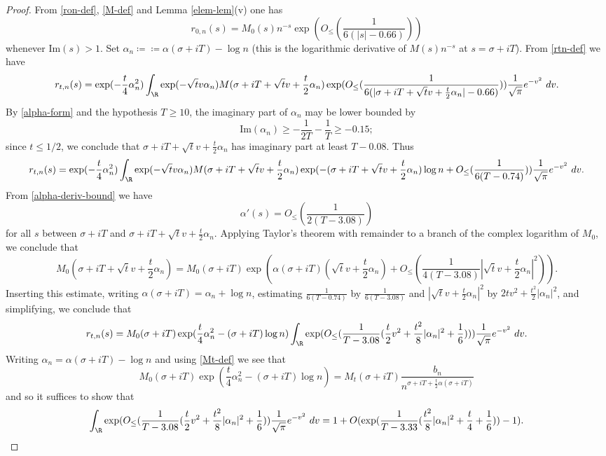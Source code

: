 \begin{proof}  From \eqref{ron-def}, \eqref{M-def} and Lemma \ref{elem-lem}(v) one has
$$ 
r_{0,n}(s) = M_0(s) n^{-s} \exp( O_{\leq}( \frac{1}{6(|s|-0.66)} ) )
$$
whenever $\mathrm{Im}(s) > 1$.  Set $\alpha_n \coloneqq \coloneqq \alpha(\sigma+iT) - \log n$ (this is the logarithmic derivative of $M(s) n^{-s}$ at $s=\sigma+iT$).  From \eqref{rtn-def} we have
$$
 r_{t,n}(s) = \exp( - \frac{t}{4} \alpha_n^2) \int_\R \exp( - \sqrt{t} v \alpha_n) M( \sigma + iT + \sqrt{t} v + \frac{t}{2} \alpha_n) 
\exp( O_{\leq}( \frac{1}{6(|\sigma+iT+\sqrt{t} v + \frac{t}{2} \alpha_n|-0.66)} ) )
\frac{1}{\sqrt{\pi}} e^{-v^2}\ dv.
$$
By \eqref{alpha-form} and the hypothesis $T \geq 10$, the imaginary part of $\alpha_n$ may be lower bounded by
$$ \mathrm{Im}(\alpha_n) \geq -\frac{1}{2T} - \frac{1}{T} \geq -0.15;$$
since $t \leq 1/2$, we conclude that $\sigma+iT+\sqrt{t} v + \frac{t}{2} \alpha_n$ has imaginary part at least $T - 0.08$.  Thus
$$
 r_{t,n}(s) = \exp( - \frac{t}{4} \alpha_n^2) \int_\R \exp( - \sqrt{t} v \alpha_n) M( \sigma + iT + \sqrt{t} v + \frac{t}{2} \alpha_n) \exp( -(\sigma+iT+\sqrt{t} v + \frac{t}{2} \alpha_n ) \log n + O_{\leq}( \frac{1}{6(T - 0.74)} ) )
\frac{1}{\sqrt{\pi}} e^{-v^2}\ dv.
$$
From \eqref{alpha-deriv-bound} we have
$$ \alpha'(s) = O_{\leq}( \frac{1}{2(T-3.08)} )$$
for all $s$ between $\sigma+iT$ and $\sigma + iT + \sqrt{t} v + \frac{t}{2} \alpha_n$.  Applying Taylor's theorem with remainder to a branch of the complex logarithm of $M_0$, we conclude that
$$ M_0( \sigma + iT + \sqrt{t} v + \frac{t}{2} \alpha_n) = M_0(\sigma+iT) \exp( \alpha(\sigma+iT) (\sqrt{t} v + \frac{t}{2} \alpha_n) + O_{\leq}( \frac{1}{4(T-3.08)} |\sqrt{t} v + \frac{t}{2} \alpha_n|^2 )).$$
Inserting this estimate, writing $\alpha(\sigma+iT) = \alpha_n + \log n$, estimating $\frac{1}{6(T-0.74)}$ by $\frac{1}{6(T-3.08)}$ and $|\sqrt{t} v + \frac{t}{2} \alpha_n|^2$ by $2tv^2 + \frac{t^2}{2} |\alpha_n|^2$, and simplifying, we conclude that
$$
 r_{t,n}(s) = M_0(\sigma+iT) \exp( \frac{t}{4} \alpha_n^2 - (\sigma+iT) \log n)
 \int_\R \exp(  O_{\leq}( \frac{1}{T-3.08} (\frac{t}{2}v^2 + \frac{t^2}{8} |\alpha_n|^2 + \frac{1}{6}) ) ) \frac{1}{\sqrt{\pi}} e^{-v^2}\ dv.$$
Writing $\alpha_n = \alpha(\sigma+iT) - \log n$ and using \eqref{Mt-def} we see that
$$ M_0(\sigma+iT) \exp( \frac{t}{4} \alpha_n^2 - (\sigma+iT) \log n) = M_t(\sigma+iT) \frac{b_n}{n^{\sigma+iT+\frac{t}{2} \alpha(\sigma+iT)}} $$
and so it suffices to show that
$$  \int_\R \exp(  O_{\leq}( \frac{1}{T-3.08} (\frac{t}{2}v^2 + \frac{t^2}{8} |\alpha_n|^2 + \frac{1}{6}) ) \frac{1}{\sqrt{\pi}} e^{-v^2}\ dv = 1 + O(\exp( \frac{1}{T-3.33} (\frac{t^2}{8} |\alpha_n|^2 + \frac{t}{4} + \frac{1}{6}))-1).$$

\end{proof}

